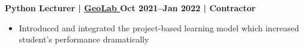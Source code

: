 \textbf{Python Lecturer | 
\href{https://geolab.edu.ge/ka-GE/Home/Login}{
    {GeoLab} 
} \hfill Oct 2021--Jan 2022 | Contractor}

\begin{itemize}[label=$\bullet$]
    \item Introduced and integrated the project-based learning model which increased student's performance dramatically
\end{itemize}\par